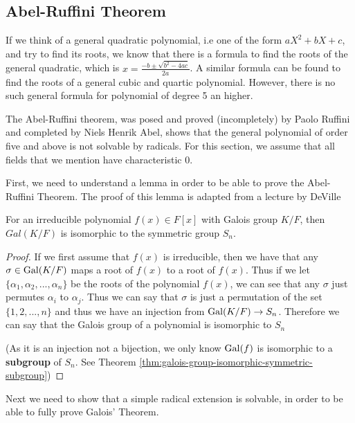 \subsection{Abel-Ruffini Theorem}

If we think of a general quadratic polynomial, i.e one of the form $aX^2+bX+c$, and try to find its roots, we know that there is a formula to find the roots of the general quadratic, which is $x = \frac{-b \pm \sqrt{b^2 - 4ac}}{2a}$. A similar formula can be found to find the roots of a general cubic and quartic polynomial. However, there is no such general formula for polynomial of degree 5 an higher.

The Abel-Ruffini theorem, was posed and proved (incompletely) by Paolo Ruffini and completed by Niels Henrik Abel, shows that the general polynomial of order five and above is not solvable by radicals. For this section, we assume that all fields that we mention have characteristic 0.

First, we need to understand a lemma in order to be able to prove the Abel-Ruffini Theorem. The proof of this lemma is adapted from a lecture by DeVille \cite{galois-lecture-polynomials}

\begin{lemma}\label{lemma:galois-symmetric}
    For an irreducible polynomial $f(x) \in F[x]$ with Galois group $K/F$, then $Gal(K/F)$ is isomorphic to the symmetric group $S_n$.
\end{lemma}

\begin{proof}
    If we first assume that $f(x)$ is irreducible, then we have that any $\sigma \in \operatorname{Gal}(K/F)$ maps a root of $f(x)$ to a root of $f(x)$. Thus if we let $\{\alpha_1,\alpha_2,...,\alpha_n\}$ be the roots of the polynomial $f(x)$, we can see that any $\sigma$ just permutes $\alpha_i$ to $\alpha_j$. Thus we can say that $\sigma$ is just a permutation of the set $\{1,2,...,n\}$ and thus we have an injection from $\operatorname{Gal}(K/F) \to S_n$. Therefore we can say that the Galois group of a polynomial is isomorphic to $S_n$ 
    
    (\TODO As it is an injection not a bijection, we only know $\operatorname{Gal}(f)$ is isomorphic to a \textbf{subgroup} of $S_n$. See Theorem \ref{thm:galois-group-isomorphic-symmetric-subgroup})
\end{proof}

Next we need to show that a simple radical extension is solvable, in order to be able to fully prove Galois' Theorem.

